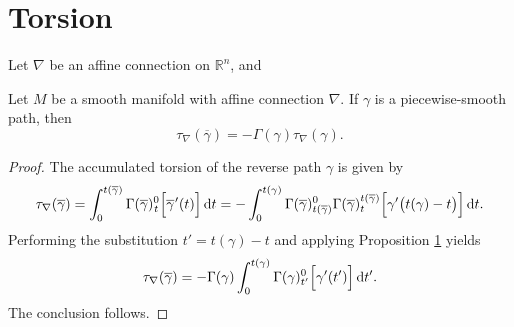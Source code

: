 \section{Torsion}

\begin{theorem}
Let $\nabla$ be an affine connection on $\mathbb{R}^n$, and 
\end{theorem}

\begin{proposition}
  Let $M$ be a smooth manifold with affine connection $\nabla$. If $\gamma$ is a piecewise-smooth path, then 
  \begin{equation}
    \tau_\nabla(\overline{\gamma}) = -\Gamma(\gamma) \tau_\nabla(\gamma).
  \end{equation}
\end{proposition}
\begin{proof}
  The accumulated torsion of the reverse path $\gamma$ is given by
  \begin{equation}
    \tau_\nabla (\overline{\gamma}) = \int_{0}^{t(\overline{\gamma})} \Gamma(\overline{\gamma})_{\hspace{0.5pt}t}^{0} \Big[ \overline{\gamma}\hspace{0.5pt}'(t) \Big] \, {\rm d} t = -\int_{0}^{t(\gamma)} \Gamma(\overline{\gamma})_{t(\overline{\gamma})}^{0} \Gamma(\overline{\gamma})_t^{t(\overline{\gamma})}\Big[\gamma'\big(t(\gamma) - t\big)\Big] \, {\rm d} t.
  \end{equation}
  Performing the substitution $t' = t(\gamma) - t$ and applying Proposition \ref{} yields
  \begin{equation}
    \tau_\nabla (\overline{\gamma}) = -  \Gamma(\gamma) \int_{0}^{t(\gamma)} \Gamma(\gamma)_{t'}^{0}\Big[\gamma'(t')\Big] \, {\rm d} t'.
  \end{equation}
  The conclusion follows.
\end{proof}

